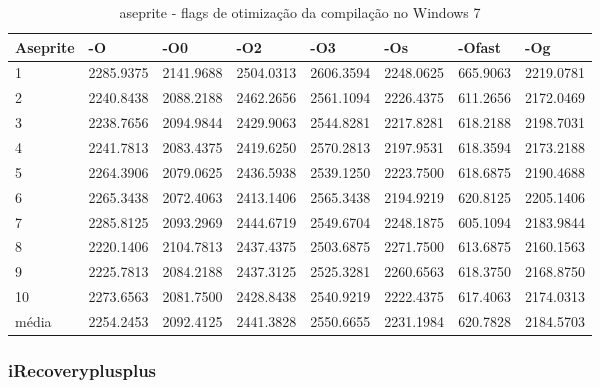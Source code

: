 \begin{table}[!ht]
\tiny
\centering
\caption{aseprite - flags de otimização da compilação no Windows 7}
\label{tab:otimizacao_compilacao:windows:aseprite}
\begin{tabular}{llllllll}
\textbf{Aseprite} & \textbf{-O}  & \textbf{-O0}   & \textbf{-O2} & \textbf{-O3} & \textbf{-Os} & \textbf{-Ofast} & \textbf{-Og} \\ \toprule
1                 &  2285.9375   &  2141.9688     & 2504.0313    &  2606.3594   &  2248.0625   & 665.9063        &  2219.0781   \\ 
2                 &  2240.8438   &  2088.2188     & 2462.2656    &  2561.1094   &  2226.4375   & 611.2656        &  2172.0469   \\ 
3                 &  2238.7656   &  2094.9844     & 2429.9063    &  2544.8281   &  2217.8281   & 618.2188        &  2198.7031   \\ 
4                 &  2241.7813   &  2083.4375     & 2419.6250    &  2570.2813   &  2197.9531   & 618.3594        &  2173.2188   \\ 
5                 &  2264.3906   &  2079.0625     & 2436.5938    &  2539.1250   &  2223.7500   & 618.6875        &  2190.4688   \\ 
6                 &  2265.3438   &  2072.4063     & 2413.1406    &  2565.3438   &  2194.9219   & 620.8125        &  2205.1406   \\ 
7                 &  2285.8125   &  2093.2969     & 2444.6719    &  2549.6704   &  2248.1875   & 605.1094        &  2183.9844   \\ 
8                 &  2220.1406   &  2104.7813     & 2437.4375    &  2503.6875   &  2271.7500   & 613.6875        &  2160.1563   \\ 
9                 &  2225.7813   &  2084.2188     & 2437.3125    &  2525.3281   &  2260.6563   & 618.3750        &  2168.8750   \\ 
10                &  2273.6563   &  2081.7500     & 2428.8438    &  2540.9219   &  2222.4375   & 617.4063        &  2174.0313   \\ \bottomrule
média             &  2254.2453   &  2092.4125     & 2441.3828    &  2550.6655   &  2231.1984   & 620.7828        &  2184.5703   \\ 
\end{tabular}
\end{table}

\clearpage
\subsubsection*{iRecoveryplusplus}


